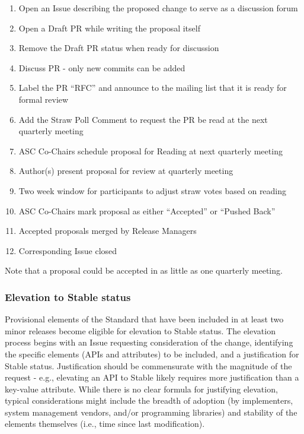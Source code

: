 \documentclass{article}
\providecommand{\tightlist}{%
  \setlength{\itemsep}{0pt}\setlength{\parskip}{0pt}}
\begin{document}
\begin{enumerate}
\def\labelenumi{\arabic{enumi}.}
\tightlist
\item
  Open an Issue describing the proposed change to serve as a discussion
  forum
\item
  Open a Draft PR while writing the proposal itself
\item
  Remove the Draft PR status when ready for discussion
\item
  Discuss PR - only new commits can be added
\item
  Label the PR ``RFC'' and announce to the mailing list that it is ready
  for formal review
\item
  Add the Straw Poll Comment to request the PR be read at the
  next quarterly meeting
\item
  ASC Co-Chairs schedule proposal for Reading at next quarterly
  meeting
\item
  Author(s) present proposal for review at quarterly meeting
\item
  Two week window for participants to adjust straw votes based on
  reading
\item
  ASC Co-Chairs mark proposal as either ``Accepted'' or ``Pushed Back''
\item
  Accepted proposals merged by Release Managers
\item
  Corresponding Issue closed
\end{enumerate}

Note that a proposal could be accepted in as little as one quarterly
meeting.

\hypertarget{elevation-to-stable-status}{%
\subsubsection{Elevation to Stable
status}\label{elevation-to-stable-status}}

Provisional elements of the Standard that have been included in at least
two minor releases become eligible for elevation to Stable
status. The elevation process begins with an Issue requesting
consideration of the change, identifying the specific elements (APIs and
attributes) to be included, and a justification for Stable status.
Justification should be commensurate with the magnitude of the request -
e.g., elevating an API to Stable likely requires more justification
than a key-value attribute. While there is no clear formula for
justifying elevation, typical considerations might include the breadth
of adoption (by implementers, system management vendors, and/or
programming libraries) and stability of the elements themselves (i.e.,
time since last modification).
\end{document}

